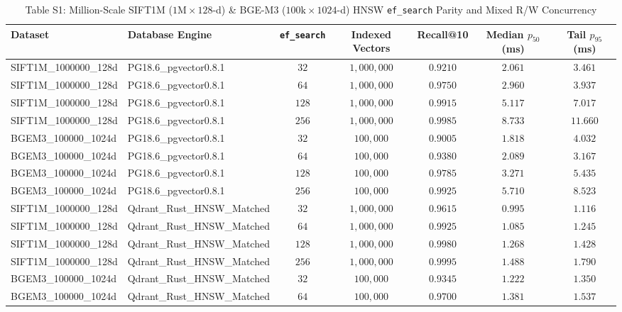 \documentclass[10pt,journal,compsoc]{IEEEtran}
\begin{document}
\begin{table}[!t]
\centering
\caption{Table S1: Million-Scale SIFT1M ($1\text{M}\times 128$-d) \& BGE-M3 ($100\text{k}\times 1024$-d) HNSW \texttt{ef\_search} Parity and Mixed R/W Concurrency}
\setlength{\tabcolsep}{4.0pt}
\renewcommand{\arraystretch}{1.04}
\begin{adjustbox}{max width=\textwidth}
\begin{tabular}{@{}llccccc@{}}
\toprule
\textbf{Dataset} & \textbf{Database Engine} & \texttt{ef\_search} & \textbf{Indexed Vectors} & \textbf{Recall@10} & \textbf{Median $p_{50}$ (ms)} & \textbf{Tail $p_{95}$ (ms)} \\
\midrule
SIFT1M\_1000000\_128d & PG18.6\_pgvector0.8.1 & $32$ & $1,000,000$ & $0.9210$ & $2.061$ & $3.461$ \\
SIFT1M\_1000000\_128d & PG18.6\_pgvector0.8.1 & $64$ & $1,000,000$ & $0.9750$ & $2.960$ & $3.937$ \\
SIFT1M\_1000000\_128d & PG18.6\_pgvector0.8.1 & $128$ & $1,000,000$ & $0.9915$ & $5.117$ & $7.017$ \\
SIFT1M\_1000000\_128d & PG18.6\_pgvector0.8.1 & $256$ & $1,000,000$ & $0.9985$ & $8.733$ & $11.660$ \\
BGEM3\_100000\_1024d & PG18.6\_pgvector0.8.1 & $32$ & $100,000$ & $0.9005$ & $1.818$ & $4.032$ \\
BGEM3\_100000\_1024d & PG18.6\_pgvector0.8.1 & $64$ & $100,000$ & $0.9380$ & $2.089$ & $3.167$ \\
BGEM3\_100000\_1024d & PG18.6\_pgvector0.8.1 & $128$ & $100,000$ & $0.9785$ & $3.271$ & $5.435$ \\
BGEM3\_100000\_1024d & PG18.6\_pgvector0.8.1 & $256$ & $100,000$ & $0.9925$ & $5.710$ & $8.523$ \\
SIFT1M\_1000000\_128d & Qdrant\_Rust\_HNSW\_Matched & $32$ & $1,000,000$ & $0.9615$ & $0.995$ & $1.116$ \\
SIFT1M\_1000000\_128d & Qdrant\_Rust\_HNSW\_Matched & $64$ & $1,000,000$ & $0.9925$ & $1.085$ & $1.245$ \\
SIFT1M\_1000000\_128d & Qdrant\_Rust\_HNSW\_Matched & $128$ & $1,000,000$ & $0.9980$ & $1.268$ & $1.428$ \\
SIFT1M\_1000000\_128d & Qdrant\_Rust\_HNSW\_Matched & $256$ & $1,000,000$ & $0.9995$ & $1.488$ & $1.790$ \\
BGEM3\_100000\_1024d & Qdrant\_Rust\_HNSW\_Matched & $32$ & $100,000$ & $0.9345$ & $1.222$ & $1.350$ \\
BGEM3\_100000\_1024d & Qdrant\_Rust\_HNSW\_Matched & $64$ & $100,000$ & $0.9700$ & $1.381$ & $1.537$ \\

\end{tabular}
\end{adjustbox}
\end{table}
\end{document}

